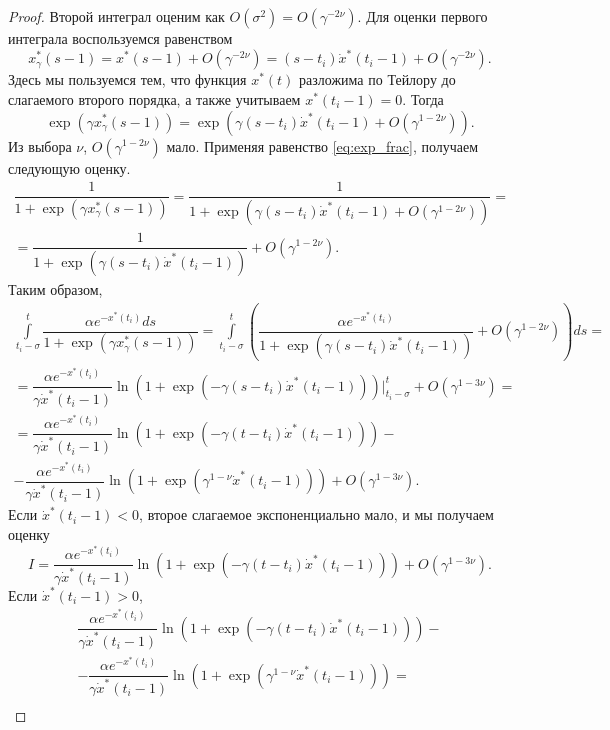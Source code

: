 \begin{proof}
	Второй интеграл оценим как $O(\sigma^2) = O(\gamma^{-2\nu})$. Для оценки первого интеграла воспользуемся равенством
	\[
	x^*_{\gamma}(s - 1) = x^*(s - 1) + O(\gamma^{-2\nu}) = (s - t_i)\dot{x}^*(t_i - 1) + O(\gamma^{-2\nu}).
	\]
	Здесь мы пользуемся тем, что функция $x^*(t)$ разложима по Тейлору до слагаемого второго порядка, а также учитываем $x^*(t_i - 1) = 0$. %
	Тогда 
	\[
	\exp(\gamma x^*_{\gamma}(s - 1)) = \exp(\gamma(s - t_i)\dot{x}^*(t_i - 1) + O(\gamma^{1 - 2\nu})).
	\]
	Из выбора $\nu$, $O(\gamma^{1 - 2\nu})$ мало. Применяя равенство \eqref{eq:exp_frac}, получаем следующую оценку.
	\begin{multline*}
	\dfrac{1}{1 + \exp(\gamma x^*_{\gamma}(s - 1))} = \dfrac{1}{1 + \exp(\gamma (s - t_i) \dot{x}^*(t_i - 1) + O(\gamma^{1 - 2\nu}))} =\\= \dfrac{1}{1 + \exp(\gamma(s - t_i)\dot{x}^*(t_i - 1))} + O(\gamma^{1 - 2\nu}).
	\end{multline*}
	Таким образом,
	\begin{multline*}
	\int\limits_{t_i - \sigma}^{t} \dfrac{\alpha e^{-x^*(t_i)} ds}{1 + \exp(\gamma x^*_{\gamma}(s - 1))} = \int\limits_{t_i - \sigma}^{t} \left(\dfrac{\alpha e^{-x^*(t_i)}}{1 + \exp(\gamma(s - t_i)\dot{x}^*(t_i - 1))} + O(\gamma^{1 - 2\nu})\right) ds =\\
	= \dfrac{\alpha e^{-x^*(t_i)}}{\gamma \dot{x}^*(t_i - 1)}\ln\left(1 + \exp(-\gamma(s - t_i)\dot{x}^*(t_i - 1))\right)\bigg\vert_{t_i - \sigma}^t + O(\gamma^{1 - 3\nu}) = \\
	= \dfrac{\alpha e^{-x^*(t_i)}}{\gamma \dot{x}^*(t_i - 1)}\ln\left(1 + \exp(-\gamma(t - t_i)\dot{x}^*(t_i - 1))\right) -\\- \dfrac{\alpha e^{-x^*(t_i)}}{\gamma \dot{x}^*(t_i - 1)}\ln\left(1 + \exp(\gamma^{1 - \nu}\dot{x}^*(t_i - 1))\right) + O(\gamma^{1 - 3\nu}).
	\end{multline*}
	Если $\dot{x}^*(t_i - 1) < 0$, второе слагаемое экспоненциально мало, и мы получаем оценку 
	\begin{equation}
	\label{eq:I_estimate_dotx_less_0}
	I = \dfrac{\alpha e^{-x^*(t_i)}}{\gamma \dot{x}^*(t_i - 1)}\ln\left(1 + \exp(-\gamma(t - t_i)\dot{x}^*(t_i - 1))\right) + O(\gamma^{1 - 3\nu}).
	\end{equation}
	Если $\dot{x}^*(t_i - 1) > 0$, 
	\begin{multline}
	\dfrac{\alpha e^{-x^*(t_i)}}{\gamma \dot{x}^*(t_i - 1)}\ln\left(1 + \exp(-\gamma(t - t_i)\dot{x}^*(t_i - 1))\right) -\\- \dfrac{\alpha e^{-x^*(t_i)}}{\gamma \dot{x}^*(t_i - 1)}\ln\left(1 + \exp(\gamma^{1 - \nu}\dot{x}^*(t_i - 1))\right) =\\

\end{multline}
\end{proof}
